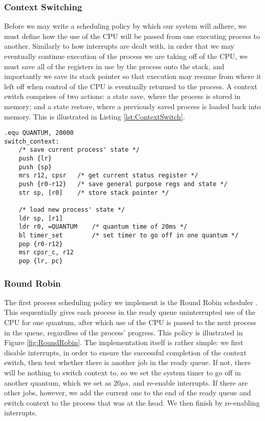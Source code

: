     \subsubsection{Context Switching}
        Before we may write a scheduling policy by which our system will adhere,
        we must define how the use of the CPU will be passed from one executing
        process to another. Similarly to how interrupts are dealt with, in order
        that we may eventually continue execution of the process we are taking
        off of the CPU, we must save all of the registers in use by the process
        onto the stack, and importantly we save its stack pointer so that
        execution may resume from where it left off when control of the CPU is
        eventually returned to the process.  A context switch comprises of two
        actions: a state save, where the process is stored in memory; and a
        state restore, where a previously saved process is loaded back into
        memory. This is illustrated in Listing \ref{lst:ContextSwitch}.

        \lstset{language=c}
        \begin{lstlisting}[caption={Context switch}, captionpos=b,
        label={lst:ContextSwitch}]
.equ QUANTUM, 20000
switch_context:
    /* save current process' state */
    push {lr}
    push {sp}
    mrs r12, cpsr   /* get current status register */
    push {r0-r12}   /* save general purpose regs and state */
    str sp, [r0]    /* store stack pointer */

    /* load new process' state */
    ldr sp, [r1]
    ldr r0, =QUANTUM    /* quantum time of 20ms */
    bl timer_set        /* set timer to go off in one quantum */
    pop {r0-r12}
    msr cpsr_c, r12
    pop {lr, pc}
        \end{lstlisting}

    \subsubsection{Round Robin}
        \label{sec:RoundRobin}
        The first process scheduling policy we implement is the Round Robin
        scheduler \cite[pg.~271]{DinosaurOS}. This sequentially gives each
        process in the ready queue uninterrupted use of the CPU for one quantum,
        after which use of the CPU is passed to the next process in the queue,
        regardless of the process' progress. This policy is illustrated in
        Figure \ref{fig:RoundRobin}. The implementation itself is rather simple:
        we first disable interrupts, in order to ensure the successful
        completion of the context switch, then test whether there is another job
        in the ready queue. If not, there will be nothing to switch context to,
        so we set the system timer to go off in another quantum, which we set as
        20$\mu s$, and re-enable interrupts. If there are other jobs, however,
        we add the current one to the end of the ready queue and switch context
        to the process that was at the head. We then finish by re-enabling
        interrupts.

